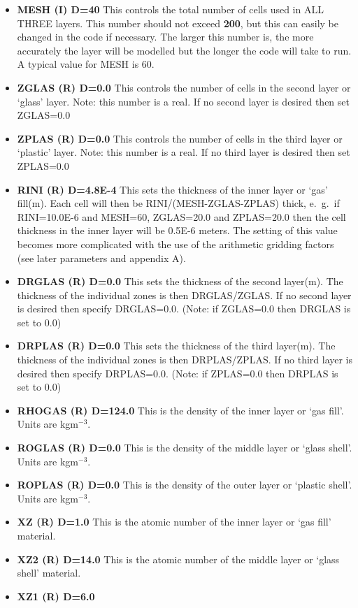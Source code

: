\begin{itemize}
\item {\bf MESH (I) D=40}
This controls the total number of cells used in ALL THREE
layers. This number should not exceed {\bf 200}, but this can easily
be changed in the code if necessary. The larger this number is,
the more accurately the layer will be modelled but the longer the
code will take to run. A typical value for MESH is 60.
\item {\bf ZGLAS (R) D=0.0}
This controls the number of cells in the second layer or
`glass' layer. Note: this number is a real. If no second layer is
desired then set ZGLAS=0.0
\item {\bf ZPLAS (R) D=0.0}
This controls the number of cells in the third layer or
`plastic' layer. Note: this number is a real. If no third layer is
desired then set ZPLAS=0.0
\item {\bf RINI (R) D=4.8E-4}
This sets the thickness of the inner layer or `gas' fill(m). Each cell
will then be RINI/(MESH-ZGLAS-ZPLAS) thick, e.\ g.\ if RINI=10.0E-6
and MESH=60, ZGLAS=20.0 and ZPLAS=20.0 then the cell thickness in
the inner layer will be 0.5E-6 meters. The setting of this value
becomes more complicated with the use of the arithmetic gridding factors
(see later parameters and appendix A).
\item {\bf DRGLAS (R) D=0.0}
This sets the thickness of the second layer(m). The thickness of the
individual zones is then DRGLAS/ZGLAS. If no second layer is desired
then specify DRGLAS=0.0. (Note: if ZGLAS=0.0 then DRGLAS is set to 0.0)
\item {\bf DRPLAS (R) D=0.0}
This sets the thickness of the third layer(m). The thickness of the
individual zones is then DRPLAS/ZPLAS. If no third layer is desired then
specify DRPLAS=0.0. (Note: if ZPLAS=0.0 then DRPLAS is set to 0.0)
\item {\bf RHOGAS (R) D=124.0}
This is the density of the inner layer or `gas fill'. Units are
kgm$^{-3}$.
\item {\bf ROGLAS (R) D=0.0}
This is the density of the middle layer or `glass shell'. Units are
kgm$^{-3}$.
\item {\bf ROPLAS (R) D=0.0}
This is the density of the outer layer or `plastic shell'. Units are
kgm$^{-3}$.
\item {\bf XZ (R) D=1.0}
This is the atomic number of the inner layer or `gas fill' material.
\item {\bf XZ2 (R) D=14.0}
This is the atomic number of the middle layer or `glass shell' material.
\item {\bf XZ1 (R) D=6.0}

\end{itemize}
